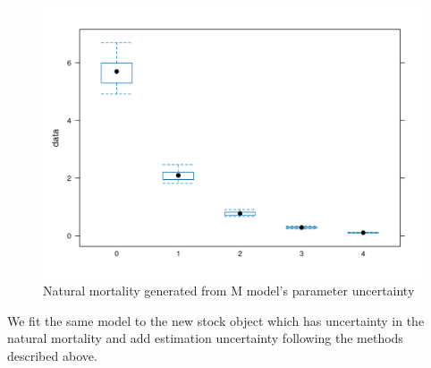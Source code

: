 \documentclass[
]{book}
\begin{document}
\begin{figure}
\centering
\includegraphics{_bookdown_files/_main_files/figure-html/m-1.png}
\caption{\label{fig:m}Natural mortality generated from M model's parameter uncertainty}
\end{figure}

We fit the same model to the new stock object which has uncertainty in the natural mortality and add estimation uncertainty following the methods described above.
\end{document}
